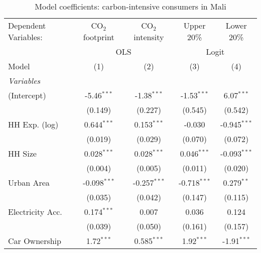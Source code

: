 
\begin{table}[htbp!]
   \centering
   \small
   \begin{adjustbox}{width = 1\textwidth, max height = 0.95\textheight, center}
      \begin{threeparttable}[b]
         \caption{\label{tab:Logit_1_MLI} Model coefficients: carbon-intensive consumers in Mali}
         \begin{tabular}{lcccc}
            \tabularnewline \midrule \midrule
            Dependent Variables: & CO$_{2}$ footprint & CO$_{2}$ intensity & Upper 20\%     & Lower 20\%\\   
             & \multicolumn{2}{c}{OLS} & \multicolumn{2}{c}{Logit} \\ 
            Model                & (1)                & (2)                & (3)            & (4)\\  
            \midrule
            \emph{Variables}\\
            (Intercept)          & -5.46$^{***}$      & -1.38$^{***}$      & -1.53$^{***}$  & 6.07$^{***}$\\   
                                 & (0.149)            & (0.227)            & (0.545)        & (0.542)\\   
            HH Exp. (log)        & 0.644$^{***}$      & 0.153$^{***}$      & -0.030         & -0.945$^{***}$\\   
                                 & (0.019)            & (0.029)            & (0.070)        & (0.072)\\   
            HH Size              & 0.028$^{***}$      & 0.028$^{***}$      & 0.046$^{***}$  & -0.093$^{***}$\\   
                                 & (0.004)            & (0.005)            & (0.011)        & (0.020)\\   
            Urban Area           & -0.098$^{***}$     & -0.257$^{***}$     & -0.718$^{***}$ & 0.279$^{**}$\\   
                                 & (0.035)            & (0.042)            & (0.147)        & (0.115)\\   
            Electricity Acc.     & 0.174$^{***}$      & 0.007              & 0.036          & 0.124\\   
                                 & (0.039)            & (0.050)            & (0.161)        & (0.157)\\   
            Car Ownership        & 1.72$^{***}$       & 0.585$^{***}$      & 1.92$^{***}$   & -1.91$^{***}$\\   

\end{tabular}
\end{threeparttable}
\end{adjustbox}
\end{table}
